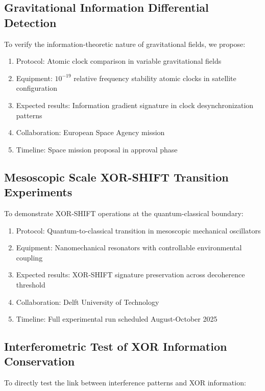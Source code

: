\documentclass[aps,prl,preprint,superscriptaddress,showpacs]{revtex4-2}
\begin{document}
\subsection{Gravitational Information Differential Detection}

To verify the information-theoretic nature of gravitational fields, we propose:

\begin{enumerate}
\item Protocol: Atomic clock comparison in variable gravitational fields
\item Equipment: $10^{-19}$ relative frequency stability atomic clocks in satellite configuration
\item Expected results: Information gradient signature in clock desynchronization patterns
\item Collaboration: European Space Agency mission
\item Timeline: Space mission proposal in approval phase
\end{enumerate}

\subsection{Mesoscopic Scale XOR-SHIFT Transition Experiments}

To demonstrate XOR-SHIFT operations at the quantum-classical boundary:

\begin{enumerate}
\item Protocol: Quantum-to-classical transition in mesoscopic mechanical oscillators
\item Equipment: Nanomechanical resonators with controllable environmental coupling
\item Expected results: XOR-SHIFT signature preservation across decoherence threshold
\item Collaboration: Delft University of Technology
\item Timeline: Full experimental run scheduled August-October 2025
\end{enumerate}

\subsection{Interferometric Test of XOR Information Conservation}

To directly test the link between interference patterns and XOR information:
\end{document}
